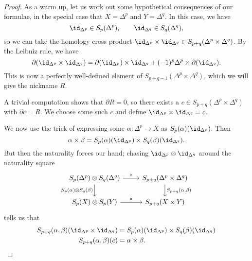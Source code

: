 \documentclass[main.tex]{subfiles}
\begin{document}
\begin{proof}
  As a warm up, let us work out some hypothetical consequences of our formulae, in the special case that $X = \Delta^{p}$ and $Y = \Delta^{q}$. In this case, we have
  \begin{equation*}
    \id_{\Delta^{p}} \in S_{p}(\Delta^{p}),\qquad \id_{\Delta^{q}} \in S_{q}(\Delta^{q}),
  \end{equation*}
  so we can take the homology cross product $\id_{\Delta^{p}} \times \id_{\Delta^{q}} \in S_{p+q}(\Delta^{p} \times \Delta^{q})$. By the Leibniz rule, we have
  \begin{equation*}
    \partial(\id_{\Delta^{p}} \times \id_{\Delta^{q}}) = \partial(\id_{\Delta^{p}}) \times \id_{\Delta^{q}} + (-1)^{p} \Delta^{p} \times \partial(\id_{\Delta^{q}}).
  \end{equation*}
  This is now a perfectly well-defined element of $S_{p+q-1}(\Delta^{p} \times \Delta^{q})$, which we will give the nickname $R$.

  A trivial computation shows that $\partial R = 0$, so there exists a $c \in S_{p+q}(\Delta^{p} \times \Delta^{q})$ with $\partial c = R$. We choose some such $c$ and define $\id_{\Delta^{p}} \times \id_{\Delta^{q}} = c$.

  We now use the trick of expressing some $\alpha\colon \Delta^{p} \to X$ as $S_{p}(\alpha)(\id_{\Delta^{p}})$. Then
  \begin{equation*}
    \alpha \times \beta = S_{p}(\alpha)(\id_{\Delta^{p}}) \times S_{q}(\beta)(\id_{\Delta^{q}}).
  \end{equation*}
  But then the naturality forces our hand; chasing $\id_{\Delta^{p}} \otimes \id_{\Delta^{q}}$ around the naturality square
  \begin{equation*}
    \begin{tikzcd}
      S_{p}(\Delta^{p}) \otimes S_{q}(\Delta^{q})
      \arrow[r, "\times"]
      \arrow[d, swap, "{S_{p}(\alpha) \otimes S_{q}(\beta)}"]
      & S_{p+q}(\Delta^{p} \times \Delta^{q})
      \arrow[d, "{S_{p+q}(\alpha, \beta)}"]
      \\
      S_{p}(X) \otimes S_{p}(Y)
      \arrow[r, "\times"]
      & S_{p+q}(X \times Y)
    \end{tikzcd}
  \end{equation*}
  tells us that 
  \begin{align*}
    S_{p+q}(\alpha, \beta)(\id_{\Delta^{p}} \times \id_{\Delta^{q}}) &= S_{p}(\alpha)(\id_{\Delta^{p}}) \times S_{q}(\beta)(\id_{\Delta^{q}}) \\
    S_{p+q}(\alpha, \beta)(c) &= \alpha \times \beta.
  \end{align*}
\end{proof}
\end{document}
